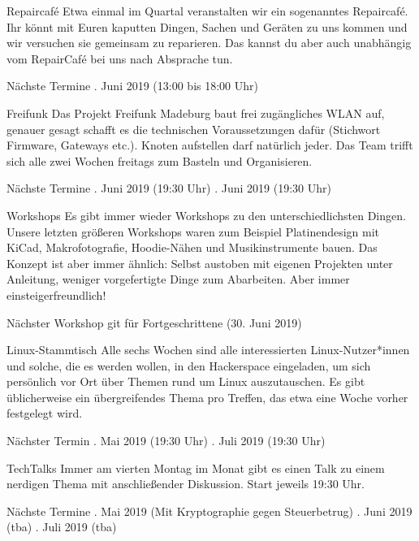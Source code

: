 \documentclass[flyer]{netz39} %
\begin{document}
\begin{entry}{Repaircafé}
Etwa einmal im Quartal veranstalten wir ein sogenanntes Repaircafé. Ihr könnt mit Euren kaputten Dingen, Sachen und Geräten zu uns kommen und wir versuchen sie gemeinsam zu reparieren. Das kannst du aber auch unabhängig vom RepairCafé bei uns nach Absprache tun.
\begin{events}{Nächste Termine}
	. Juni 2019 (13:00 bis 18:00 Uhr)
\end{events}
\end{entry}

\begin{entry}{Freifunk}
Das Projekt Freifunk Madeburg baut frei zugängliches WLAN auf, genauer gesagt schafft es die technischen Voraussetzungen dafür (Stichwort Firmware, Gateways etc.). Knoten aufstellen darf natürlich jeder. Das Team trifft sich alle zwei Wochen freitags zum Basteln und Organisieren.
\begin{events}{Nächste Termine}
	. Juni 2019 (19:30 Uhr)
	. Juni 2019 (19:30 Uhr)
\end{events}
\end{entry}


\begin{entry}{Workshops}
Es gibt immer wieder Workshops zu den unterschiedlichsten Dingen. Unsere letzten größeren Workshops waren zum Beispiel Platinendesign mit KiCad, Makrofotografie, Hoodie-Nähen und Musikinstrumente bauen. Das Konzept ist aber immer ähnlich: Selbst austoben mit eigenen Projekten unter Anleitung, weniger vorgefertigte Dinge zum Abarbeiten. Aber immer einsteigerfreundlich!
\begin{events}{Nächster Workshop}
	\event git für Fortgeschrittene (30. Juni 2019)
\end{events}
\end{entry}

\begin{entry}{Linux-Stammtisch}
Alle sechs Wochen sind alle interessierten Linux-Nutzer*innen und solche, die es werden wollen, in den Hackerspace eingeladen, um sich persönlich vor Ort über Themen rund um Linux auszutauschen. Es gibt üblicherweise ein übergreifendes Thema pro Treffen, das etwa eine Woche vorher festgelegt wird. 
\begin{events}{Nächster Termin}
	. Mai 2019 (19:30 Uhr)
	. Juli 2019 (19:30 Uhr)
\end{events}
\end{entry}

\begin{entry}{TechTalks}
Immer am vierten Montag im Monat gibt es einen Talk zu einem nerdigen Thema mit anschließender Diskussion. Start jeweils 19:30 Uhr.
\begin{events}{Nächste Termine}
	. Mai 2019 (Mit Kryptographie gegen Steuerbetrug)
	. Juni 2019 (tba)
	. Juli 2019 (tba)
\end{events}
\end{entry}
\end{document}
